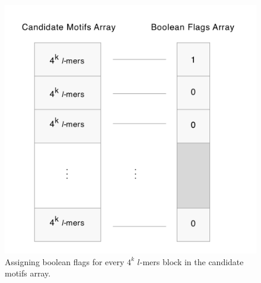 \begin{figure}[h]
	\centering
	\label{fig:boolean-flags}
	\includegraphics[width=5in]{contents/00_images/boolean-flags}\vspace*{5pt}
	\caption{Assigning boolean flags for every $4^k$ $l$-mers block in the candidate motifs array.}
\end{figure}